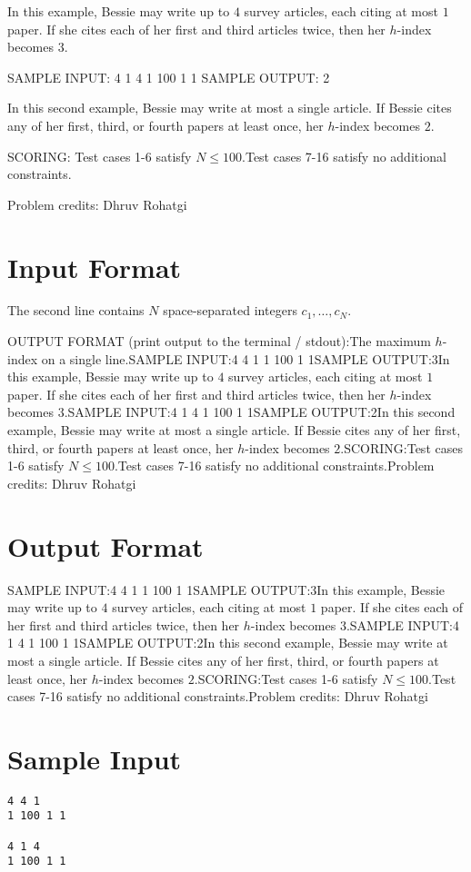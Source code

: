 \documentclass[12pt]{article}
\begin{document}
In this example, Bessie may write up to $4$ survey articles, each citing at most $1$ paper.
If she cites each of her first and third articles twice, then her $h$-index
becomes
$3$.

SAMPLE INPUT:
4 1 4
1 100 1 1
SAMPLE OUTPUT: 
2

In this second example, Bessie may write at most a single article. If Bessie cites any
of her first, third, or fourth papers at least once, her $h$-index becomes $2$.

SCORING:
Test cases 1-6 satisfy $N\le 100$.Test cases 7-16 satisfy no additional constraints.


Problem credits: Dhruv Rohatgi



\section*{Input Format}
The second line contains $N$ space-separated integers $c_1,\ldots, c_N$.

OUTPUT FORMAT (print output to the terminal / stdout):The maximum $h$-index on a single line.SAMPLE INPUT:4 4 1
1 100 1 1SAMPLE OUTPUT:3In this example, Bessie may write up to $4$ survey articles, each citing at most $1$ paper.
If she cites each of her first and third articles twice, then her $h$-index
becomes
$3$.SAMPLE INPUT:4 1 4
1 100 1 1SAMPLE OUTPUT:2In this second example, Bessie may write at most a single article. If Bessie cites any
of her first, third, or fourth papers at least once, her $h$-index becomes $2$.SCORING:Test cases 1-6 satisfy $N\le 100$.Test cases 7-16 satisfy no additional constraints.Problem credits: Dhruv Rohatgi

\section*{Output Format}
SAMPLE INPUT:4 4 1
1 100 1 1SAMPLE OUTPUT:3In this example, Bessie may write up to $4$ survey articles, each citing at most $1$ paper.
If she cites each of her first and third articles twice, then her $h$-index
becomes
$3$.SAMPLE INPUT:4 1 4
1 100 1 1SAMPLE OUTPUT:2In this second example, Bessie may write at most a single article. If Bessie cites any
of her first, third, or fourth papers at least once, her $h$-index becomes $2$.SCORING:Test cases 1-6 satisfy $N\le 100$.Test cases 7-16 satisfy no additional constraints.Problem credits: Dhruv Rohatgi

\section*{Sample Input}
\begin{verbatim}
4 4 1
1 100 1 1

4 1 4
1 100 1 1
\end{verbatim}
\end{document}
